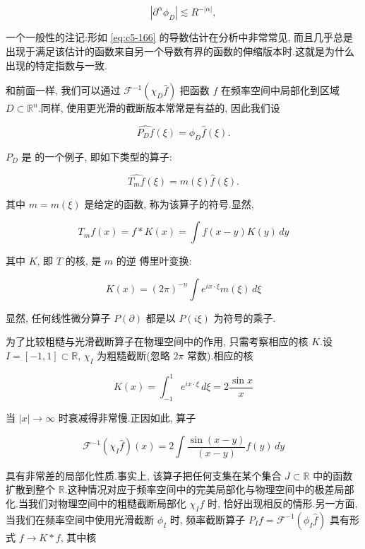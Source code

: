 \begin{equation}
|\partial^\alpha\phi_D|\lesssim R^{-|\alpha|}, \label{eq:c5-166}
\end{equation}

一个一般性的注记:形如 \eqref{eq:c5-166} 的导数估计在分析中非常常见, 而且几乎总是出现于满足该估计的函数来自另一个导数有界的函数的伸缩版本时.这就是为什么出现的特定指数与一致.


和前面一样, 我们可以通过 $\mathcal{F}^{-1}(\chi_D\hat{f})$ 把函数 $f$ 在频率空间中局部化到区域 $D\subset\mathbb{R}^n$.同样, 使用更光滑的截断版本常常是有益的, 因此我们设

\[
\widehat{P_Df}(\xi) = \phi_D\hat{f}(\xi).
\]

$P_D$ 是 的一个例子, 即如下类型的算子:

\begin{equation}
\widehat{T_mf}(\xi) = m(\xi)\hat{f}(\xi).\label{eq:c5-167}
\end{equation}

其中 $m = m(\xi)$ 是给定的函数, 称为该算子的符号.显然,

\begin{equation}
T_mf(x) = f*K(x) = \int f(x-y)K(y)\, dy\label{eq:c5-168}
\end{equation}

其中 $K$, 即 $T$ 的核, 是 $m$ 的逆 傅里叶变换:

\[
K(x) = (2\pi)^{-n}\int e^{ix\cdot\xi}m(\xi)\, d\xi
\]

显然, 任何线性微分算子 $P(\partial)$ 都是以 $P(i\xi)$ 为符号的乘子.

为了比较粗糙与光滑截断算子在物理空间中的作用, 只需考察相应的核 $K$.设 $I = [-1, 1]\subset\mathbb{R}$, $\chi_I$ 为粗糙截断(忽略 $2\pi$ 常数).相应的核

\[
K(x) = \int_{-1}^{1} e^{ix\cdot\xi}\, d\xi = 2\frac{\sin x}{x}
\]

当 $|x|\to\infty$ 时衰减得非常慢.正因如此, 算子

\[
\mathcal{F}^{-1}(\chi_I\hat{f})(x) = 2\int\frac{\sin(x-y)}{(x-y)}f(y)\, dy
\]

具有非常差的局部化性质.事实上, 该算子把任何支集在某个集合 $J\subset\mathbb{R}$ 中的函数扩散到整个 $\mathbb{R}$.这种情况对应于频率空间中的完美局部化与物理空间中的极差局部化.当我们对物理空间中的粗糙截断局部化 $\chi_If$ 时, 恰好出现相反的情形.另一方面, 当我们在频率空间中使用光滑截断 $\phi_I$ 时, 频率截断算子 $P_If = \mathcal{F}^{-1}(\phi_I\hat{f})$ 具有形式 $f\to K*f$, 其中核

